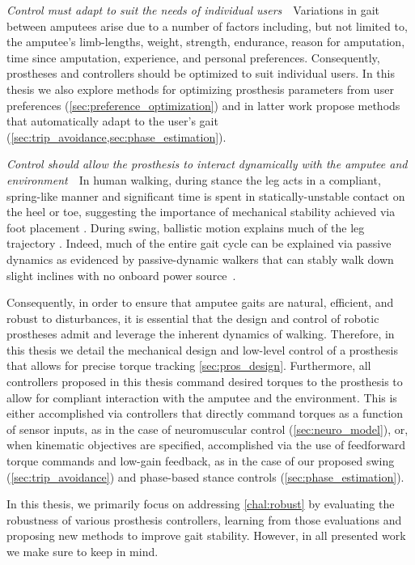 \begin{challenges}
    \item\label{chal:unique} \emph{Control must adapt to suit the needs of
    individual users}~~Variations in gait between amputees arise due to a number
    of factors including, but not limited to, the amputee's limb-lengths,
    weight, strength, endurance, reason for amputation, time since amputation,
    experience, and personal preferences. Consequently, prostheses and
    controllers should be optimized to suit individual users. In this thesis we
    also explore methods for optimizing prosthesis parameters from user
    preferences (\cref{sec:preference_optimization}) and in latter work propose
    methods that automatically adapt to the user's gait
    (\cref{sec:trip_avoidance,sec:phase_estimation}).

    \item\label{chal:dynamic} \emph{Control should allow the prosthesis to
    interact dynamically with the amputee and environment}~~In human walking,
    during stance the leg acts in a compliant, spring-like manner
    \citep{geyer2006compliant} and significant time is spent in
    statically-unstable contact on the heel or toe, suggesting the importance of
    mechanical stability achieved via foot placement \citep{perry2010gait}.
    During swing, ballistic motion explains much of the leg trajectory
    \citep{mochon1980ballistic}. Indeed, much of the entire gait cycle can be
    explained via passive dynamics as evidenced by passive-dynamic walkers that
    can stably walk down slight inclines with no onboard power
    source~\citep{mcgeer1990passive, collins2005efficient}.

    Consequently, in order to ensure that amputee gaits are natural, efficient,
    and robust to disturbances, it is essential that the design and control of
    robotic prostheses admit and leverage the inherent dynamics of walking.
    Therefore, in this thesis we detail the mechanical design and low-level
    control of a prosthesis that allows for precise torque tracking
    \cref{sec:pros_design}.  Furthermore, all controllers proposed in this
    thesis command desired torques to the prosthesis to allow for compliant
    interaction with the amputee and the environment. This is either
    accomplished via controllers that directly command torques as a function of
    sensor inputs, as in the case of neuromuscular control
    (\cref{sec:neuro_model}), or, when kinematic objectives are specified,
    accomplished via the use of feedforward torque commands and low-gain
    feedback, as in the case of our proposed swing (\cref{sec:trip_avoidance})
    and phase-based stance controls (\cref{sec:phase_estimation}).
\end{challenges}

In this thesis, we primarily focus on addressing \cref{chal:robust} by
evaluating the robustness of various prosthesis controllers, learning from those
evaluations and proposing new methods to improve gait stability. However, in all
presented work we make sure to keep  in
mind.
